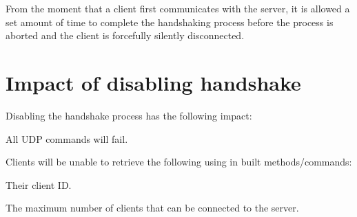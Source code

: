 From the moment that a client first communicates with the server, it is allowed a set amount of time to complete the handshaking process before the process is aborted and the client is forcefully silently disconnected.\par
\par
\hypertarget{handshake_page_handshakeDisable}{}\section{Impact of disabling handshake}\label{handshake_page_handshakeDisable}
Disabling the handshake process has the following impact:
\begin{DoxyItemize}
\item All UDP commands will fail.
\item Clients will be unable to retrieve the following using in built methods/commands:
\begin{DoxyItemize}
\item Their client ID.
\item The maximum number of clients that can be connected to the server. 
\end{DoxyItemize}
\end{DoxyItemize}